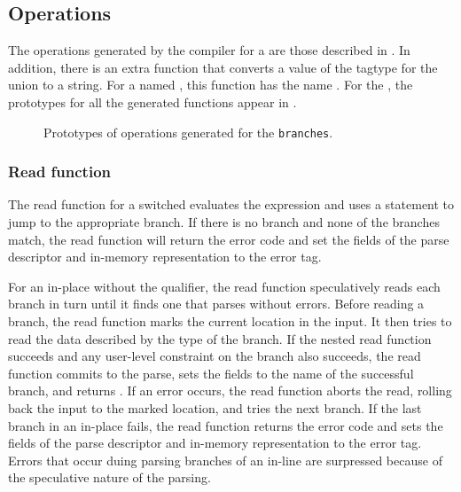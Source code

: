 \subsection{Operations}
The operations generated by the \pads{} compiler for a \Punion{} are
those described in .  In addition, there
is an extra function that converts a value of the tagtype for the
union to a string.  For a \Punion{} named , this function
has the name .  
For the \Punion{}
, the prototypes for all the generated functions appear in
.
\begin{figure}
\caption{Prototypes of operations generated for
  the \Punion{} \texttt{branches}.}
\label{fig:punion-ops}
\end{figure}



\subsubsection{Read function}
The read function for a switched \Punion{} evaluates the \Pswitch{}
expression and uses a \C{}  statement to jump to the
appropriate branch.  If there is no \Pdefault{} branch and none of the
\Pcase{} branches match,  the read function will return the error code
 and set the  fields of the parse
descriptor and in-memory representation to the error tag. 

For an in-place \Punion{} without the \Plongest{} qualifier, the read
function speculatively reads each 
branch in turn until it finds one that parses without errors.  Before
reading a branch, the read function marks the 
current location in the input.  It then tries to read the data
described by the type of the branch.  If the nested read function
succeeds and any user-level constraint on the branch also succeeds,
the read function commits to the parse, sets the  fields to
the name of the successful branch, and returns
. If an error occurs, the read function aborts the
read, rolling back the input to the marked location, and tries the next
branch.  If the last branch in an in-place \Punion{} fails, the read
function returns the error code
 and sets the  fields of the parse
descriptor and in-memory representation to the error tag. 
Errors that occur duing parsing branches of an in-line \Punion{} are
surpressed because of the speculative nature of the parsing.

